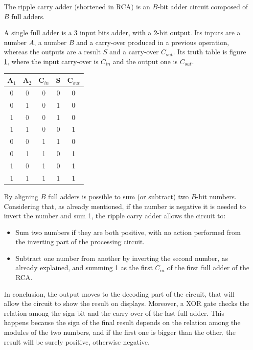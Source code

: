 \documentclass{article}
\begin{document}
The ripple carry adder (shortened in RCA) is an $B$-bit adder circuit composed of $B$ full adders. 

A single full adder is a 3 input bits adder, with a 2-bit output. Its inputs are a number $A$, a number $B$ and a carry-over produced in a previous operation, whereas the outputs are a result $S$ and a carry-over $C_{out}$. Its truth table is figure \ref{FullAdder}, where the input carry-over is $C_{in}$ and the output one is $C_{out}$.

\begin{table}[h]
  \centering
  \begin{tabular}{|| c | c | c || c | c ||}
  \hline
  A$_1$ & A$_2$ & C$_{in}$ & S & C$_{out}$ \\ \hline
  0 & 0 & 0 & 0 & 0 \\ \hline
  0 & 1 & 0 & 1 & 0 \\ \hline
  1 & 0 & 0 & 1 & 0 \\ \hline
  1 & 1 & 0 & 0 & 1 \\ \hline
  0 & 0 & 1 & 1 & 0 \\ \hline
  0 & 1 & 1 & 0 & 1 \\ \hline
  1 & 0 & 1 & 0 & 1 \\ \hline
  1 & 1 & 1 & 1 & 1 \\ \hline
  \end{tabular}
  \label{FullAdder}
\end{table}

By aligning $B$ full adders is possible to sum (or subtract) two $B$-bit numbers. Considering that, as already mentioned, if the number is negative it is needed to invert the number and sum 1, the ripple carry adder allows the circuit to:
\begin{itemize}
  \item Sum two numbers if they are both positive, with no action performed from the inverting part of the processing circuit.
  \item Subtract one number from another by inverting the second number, as already explained, and summing 1 as the first $C_{in}$ of the first full adder of the RCA.
\end{itemize}
  
In conclusion, the output moves to the decoding part of the circuit, that will allow the circuit to show the result on displays. Moreover, a XOR gate checks the relation among the sign bit and the carry-over of the last full adder. This happens because the sign of the final result depends on the relation among the modules of the two numbers, and if the first one is bigger than the other, the result will be surely positive, otherwise negative.
\end{document}

